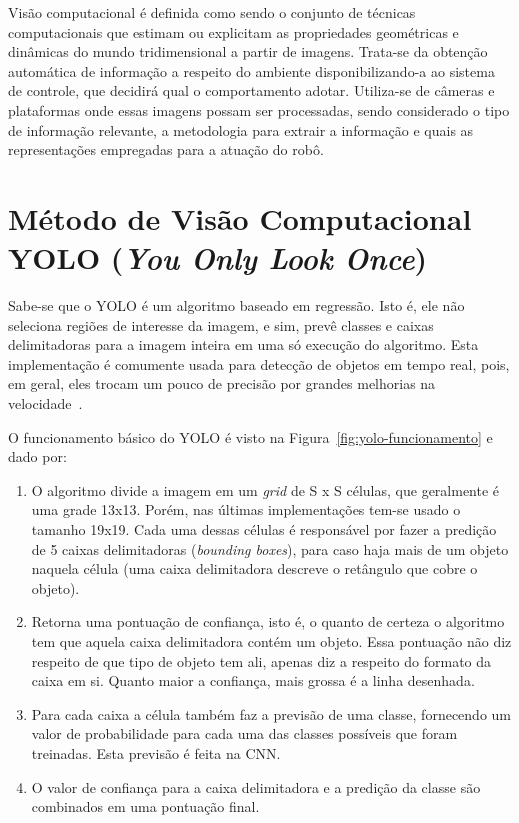 Visão computacional é definida como sendo o conjunto de técnicas computacionais que estimam ou explicitam as propriedades geométricas e dinâmicas do mundo tridimensional a partir de imagens. Trata-se da obtenção automática de informação a respeito do ambiente disponibilizando-a ao sistema de controle, que decidirá qual o comportamento adotar. Utiliza-se de câmeras e plataformas onde essas imagens possam ser processadas, sendo considerado o tipo de informação relevante, a metodologia para extrair a informação e quais as representações empregadas para a atuação do robô.

\section{Método de Visão Computacional YOLO (\textit{You Only Look Once})}
\label{sec:matmetYOLO}

Sabe-se que o YOLO é um algoritmo baseado em regressão. Isto é, ele não seleciona regiões de interesse da imagem, e sim, prevê classes e caixas delimitadoras para a imagem inteira em uma só execução do algoritmo. Esta implementação é comumente usada para detecção de objetos em tempo real, pois, em geral, eles trocam um pouco de precisão por grandes melhorias na velocidade~\cite{swiezewski2020}.

O funcionamento básico do YOLO é visto na Figura~\ref{fig:yolo-funcionamento} e dado por:
\begin{enumerate}
    \item O algoritmo divide a imagem em um \textit{grid} de S x S células, que geralmente é uma grade 13x13. Porém, nas últimas implementações tem-se usado o tamanho 19x19. Cada uma dessas células é responsável por fazer a predição de 5 caixas delimitadoras (\textit{bounding boxes}), para caso haja mais de um objeto naquela célula (uma caixa delimitadora descreve o retângulo que cobre o objeto).
    \item Retorna uma pontuação de confiança, isto é, o quanto de certeza o algoritmo tem que aquela caixa delimitadora contém um objeto. Essa pontuação não diz respeito de que tipo de objeto tem ali, apenas diz a respeito do formato da caixa em si. Quanto maior a confiança, mais grossa é a linha desenhada.
    \item Para cada caixa a célula também faz a previsão de uma classe, fornecendo um valor de probabilidade para cada uma das classes possíveis que foram treinadas. Esta previsão é feita na CNN.
    \item O valor de confiança para a caixa delimitadora e a predição da classe são combinados em uma pontuação final.
\end{enumerate}

